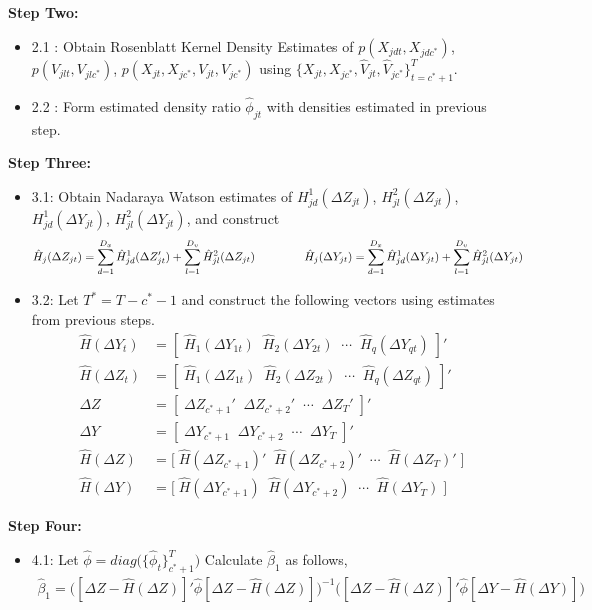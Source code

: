 \documentclass[10pt]{article}
\begin{document}
\noindent \bf Step Two: \rm 
\begin{itemize} 
    \item 2.1 : Obtain Rosenblatt Kernel Density Estimates of $p(X_{jdt},X_{jdc^*})$, $p(V_{jlt},V_{jlc^*})$, $p(X_{jt},X_{jc^*},V_{jt},V_{jc^*})$ using $\{ X_{jt},X_{jc^*},\hat{V}_{jt}, \hat{V}_{jc^*}\}_{t=c^*+1}^T$.  
    \item 2.2 : Form estimated density ratio $\hat{\phi}_{jt}$ with densities estimated in previous step. 
\end{itemize}
\noindent \bf Step Three: \rm 
\begin{itemize} 
    \item 3.1: Obtain Nadaraya Watson estimates of $H^1_{jd}(\Delta Z_{jt})$, $H^2_{jl}(\Delta Z_{jt})$, $H^1_{jd}(\Delta Y_{jt})$, $H^2_{jl}(\Delta Y_{jt})$, and construct 
    \begin{align*} 
    \hat{H}_j(\Delta Z_{jt}) &= \sum_{d=1}^{D_x} \hat{H}^1_{jd}(\Delta Z_{jt}') + \sum_{l=1}^{D_v} \hat{H}^2_{jl}(\Delta Z_{jt})  \hspace{1.5cm}
%
\hat{H}_j(\Delta Y_{jt}) = \sum_{d=1}^{D_x} \hat{H}^1_{jd}(\Delta Y_{jt}) + \sum_{l=1}^{D_v} \hat{H}^2_{jl}(\Delta Y_{jt}) 
    \end{align*}

    \item 3.2: Let $T^* = T - c^*-1$  and construct the following vectors using estimates from previous steps. 
    \begin{align*} 
   \hat{H}(\Delta Y_t)  &= [ \; \hat{H}_1(\Delta Y_{1t}) \;\; \hat{H}_2(\Delta Y_{2t}) \;\; \cdots \;\; \hat{H}_q(\Delta Y_{qt}) \; ]'\\
%
\hat{H}(\Delta Z_t)  &= [ \; \hat{H}_1(\Delta Z_{1t}) \;\; \hat{H}_2(\Delta Z_{2t}) \;\; \cdots \;\; \hat{H}_q(\Delta Z_{qt}) \; ]'\\
%
\Delta Z &= [ \; \Delta Z_{c^*+1}' \;\; \Delta Z_{c^*+2}' \;\; \cdots \;\; \Delta Z_{T}' \;]' \\
%
 \Delta Y &= [ \; \Delta Y_{c^*+1} \;\; \Delta Y_{c^*+2} \;\; \cdots \;\; \Delta Y_{T} \;]' \\
%
\hat{H}(\Delta Z) &= \big[\; \hat{H}(\Delta Z_{c^*+1})' \;\; \hat{H}(\Delta Z_{c^* +2})' \;\;\cdots \;\; \hat{H}(\Delta Z_{T})' \; \big] \\
%
 \hat{H}(\Delta Y) &= \big[\; \hat{H}(\Delta Y_{c^*+1}) \;\; \hat{H}(\Delta Y_{c^* +2}) \;\;\cdots \;\; \hat{H}(\Delta Y_{T}) \; \big]
\end{align*}
\end{itemize}
%
\noindent \bf Step Four:\rm 
\begin{itemize}
    \item 4.1: Let $\hat{\phi} = diag\big( \{\hat{\phi}_t\}_{c^*+1}^T \big)$ Calculate $\hat{\beta}_1$ as follows,  
    \begin{align*} 
  \hat{\beta}_1 = \Big( [\Delta Z - \hat{H}(\Delta Z)]' \hat{\phi} [\Delta Z - \hat{H}(\Delta Z)] \Big)^{-1} \Big( [\Delta Z - \hat{H}(\Delta Z)]' \hat{\phi} [\Delta Y - \hat{H}(\Delta Y)] \Big)
    \end{align*}
\end{itemize}


 









 

 
\end{document}
